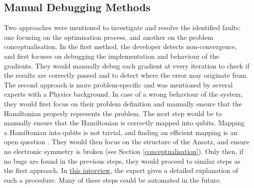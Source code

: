 \subsection{Manual Debugging Methods}
Two approaches were mentioned to investigate and resolve the identified faults: one focusing on the optimisation process, and another on the problem conceptualisation. In the first method, the developer detects non-convergence, and first focuses on debugging the implementation and behaviour of the gradients. They would manually debug each gradient at every iteration to check if the results are correctly passed and to detect where the error may originate from. The second approach is more problem-specific and was mentioned by several experts with a Physics background. In case of a wrong behaviour of the system, they would first focus on their problem definition and manually ensure that the Hamiltonian properly represents the problem. The next step would be to manually ensure that the Hamiltonian is correctly mapped into qubits. Mapping a Hamiltonian into qubits is not trivial, and finding an efficient mapping is an open question  \cite{tilly_variational_2022}. They would then focus on the structure of the Ansatz, and ensure no electronic symmetry is broken (see  Section \ref{conceptualisation}). Only then, if no bugs are found in the previous steps, they would proceed to similar steps as the first approach. In \href{https://anonymous.4open.science/r/A-Taxonomy-of-Real-Faults-in-Hybrid-Quantum-Classical-Architectures-EE25/Interviews/Pollished/Interview5_Pollished.docx}{this interview}, the expert gives a detailed explanation of such a procedure. Many of these steps could be automated in the future.


